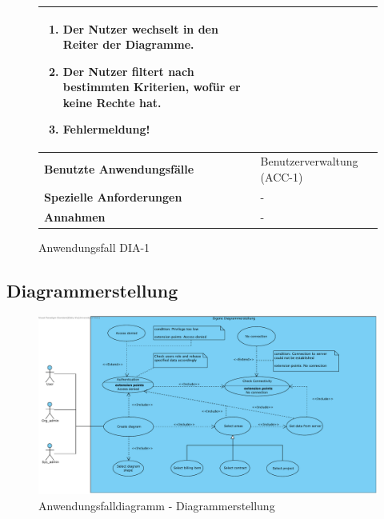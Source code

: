 \begin{figure}[h]
\begin{tabularx}{\textwidth}{ X | X }
\begin{enumerate}
			\item Der Nutzer wechselt in den Reiter der Diagramme.
			\item Der Nutzer filtert nach bestimmten Kriterien, wofür er keine Rechte hat.
			\item Fehlermeldung!
		\end{enumerate}  \\ \hline
		\textbf{Benutzte Anwendungsfälle} & Benutzerverwaltung (ACC-1) \\ \hline
		\textbf{Spezielle Anforderungen} & - \\ \hline
		\textbf{Annahmen} & -
	\end{tabularx}
	\caption{Anwendungsfall DIA-1}
	\label{fig:anwendungsfall-diagrammdarstellung-tabelle-DIA-1}
\end{figure}

\clearpage

\subsection{Diagrammerstellung}

\begin{figure}[h]
	\centering
	\includegraphics[width=\linewidth]{img/diagrams/Create_Custom_Diagram.pdf}
	\caption{Anwendungsfalldiagramm - Diagrammerstellung}
	\label{fig:anwendungsfalldiagramm-dia-erstellung}
\end{figure}

\newpage

